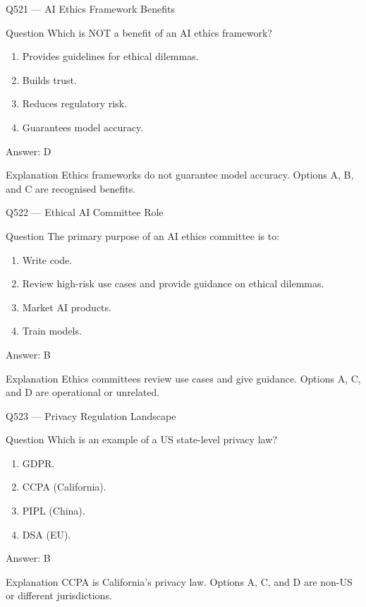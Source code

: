 \documentclass[aspectratio=169,8pt]{beamer}
\begin{document}
	\begin{frame}{Q521 --- AI Ethics Framework Benefits}
		\begin{block}{Question}
			Which is NOT a benefit of an AI ethics framework?
			\begin{enumerate}
				\item Provides guidelines for ethical dilemmas.
				\item Builds trust.
				\item Reduces regulatory risk.
				\item Guarantees model accuracy.
			\end{enumerate}
		\end{block}
		\begin{exampleblock}{Answer: D}\end{exampleblock}
		\begin{block}{Explanation}
			Ethics frameworks do not guarantee model accuracy. Options A, B, and C are recognised benefits.
		\end{block}
	\end{frame}
	
	\begin{frame}{Q522 --- Ethical AI Committee Role}
		\begin{block}{Question}
			The primary purpose of an AI ethics committee is to:
			\begin{enumerate}
				\item Write code.
				\item Review high-risk use cases and provide guidance on ethical dilemmas.
				\item Market AI products.
				\item Train models.
			\end{enumerate}
		\end{block}
		\begin{exampleblock}{Answer: B}\end{exampleblock}
		\begin{block}{Explanation}
			Ethics committees review use cases and give guidance. Options A, C, and D are operational or unrelated.
		\end{block}
	\end{frame}
	
	\begin{frame}{Q523 --- Privacy Regulation Landscape}
		\begin{block}{Question}
			Which is an example of a US state-level privacy law?
			\begin{enumerate}
				\item GDPR.
				\item CCPA (California).
				\item PIPL (China).
				\item DSA (EU).
			\end{enumerate}
		\end{block}
		\begin{exampleblock}{Answer: B}\end{exampleblock}
		\begin{block}{Explanation}
			CCPA is California's privacy law. Options A, C, and D are non-US or different jurisdictions.
		\end{block}
	\end{frame}
	
\end{document}
